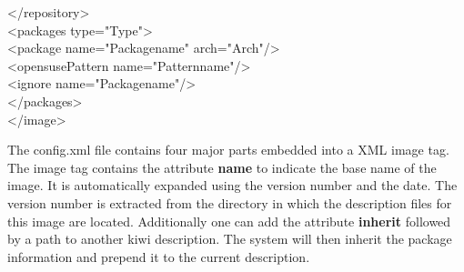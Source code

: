 \begin{itemize}
\begin{Command}{13cm}
      \hspace*{1cm}</repository>\\
      \hspace*{1cm}<packages type="Type">\\
      \hspace*{2cm}<package name="Packagename" arch="Arch"/>\\
      \hspace*{2cm}<opensusePattern name="Patternname"/>\\
      \hspace*{2cm}<ignore name="Packagename"/>\\
      \hspace*{1cm}</packages>\\
      </image>
	  \end{Command}

      The config.xml file contains four major parts embedded into a
      XML image tag. The image tag contains the attribute \textbf{name}
      to indicate the base name of the image. It is automatically expanded
      using the version number and the date. The version number is
      extracted from the directory in which the description files for
      this image are located. Additionally one can add the attribute
      \textbf{inherit} followed by a path to another kiwi description.
      The system will then inherit the package information and prepend
      it to the current description.


\end{itemize}
